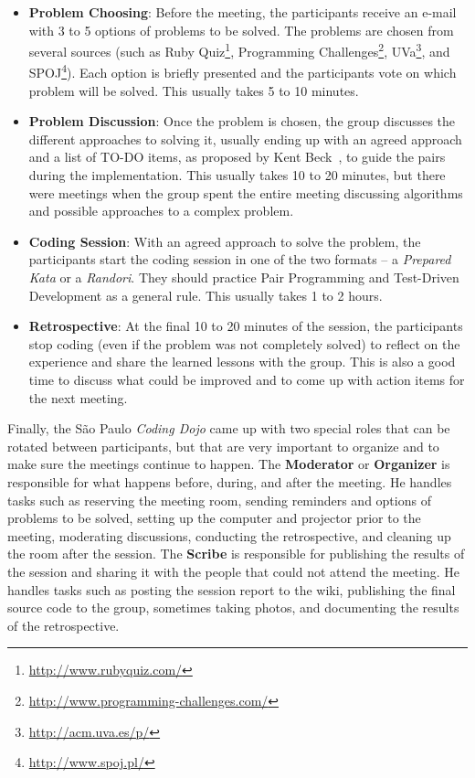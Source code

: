 \begin{itemize}
\item \textbf{Problem Choosing}: Before the meeting, the participants
  receive an e-mail with 3 to 5 options of problems to be solved. The
  problems are chosen from several sources (such as Ruby
  Quiz\footnote{\url{http://www.rubyquiz.com/}}, Programming
  Challenges\footnote{\url{http://www.programming-challenges.com/}},
  UVa\footnote{\url{http://acm.uva.es/p/}}, and
  SPOJ\footnote{\url{http://www.spoj.pl/}}). Each option is briefly
  presented and the participants vote on which problem will be solved.
  This usually takes 5 to 10 minutes.
	
\item \textbf{Problem Discussion}: Once the problem is chosen, the
  group discusses the different approaches to solving it, usually
  ending up with an agreed approach and a list of TO-DO items, as
  proposed by Kent Beck~\cite{TDD}, to guide the pairs during the
  implementation. This usually takes 10 to 20 minutes, but there were
  meetings when the group spent the entire meeting discussing
  algorithms and possible approaches to a complex problem.
	
\item \textbf{Coding Session}: With an agreed approach to solve the
  problem, the participants start the coding session in one of the two
  formats -- a \emph{Prepared Kata} or a \emph{Randori}. They should
  practice Pair Programming and Test-Driven Development as a general
  rule. This usually takes 1 to 2 hours.

\item \textbf{Retrospective}: At the final 10 to 20 minutes of the
  session, the participants stop coding (even if the problem was not
  completely solved) to reflect on the experience and share the
  learned lessons with the group. This is also a good time to discuss
  what could be improved and to come up with action items for the next
  meeting.
\end{itemize}

Finally, the São Paulo \emph{Coding Dojo} came up with two special
roles that can be rotated between participants, but that are very
important to organize and to make sure the meetings continue to
happen. The \textbf{Moderator} or \textbf{Organizer} is responsible
for what happens before, during, and after the meeting. He handles
tasks such as reserving the meeting room, sending reminders and
options of problems to be solved, setting up the computer and
projector prior to the meeting, moderating discussions, conducting the
retrospective, and cleaning up the room after the session. The
\textbf{Scribe} is responsible for publishing the results of the
session and sharing it with the people that could not attend the
meeting. He handles tasks such as posting the session report to the
wiki, publishing the final source code to the group, sometimes taking
photos, and documenting the results of the retrospective.
